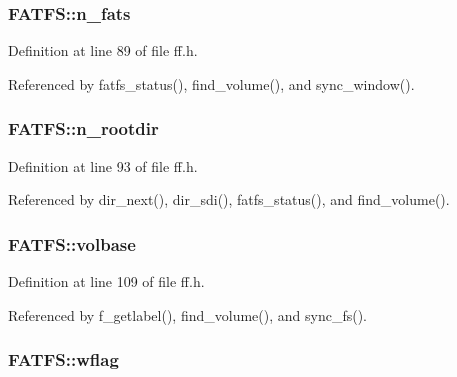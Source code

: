\subsubsection[{\texorpdfstring{n\+\_\+fats}{n_fats}}]{ F\+A\+T\+F\+S\+::n\+\_\+fats}\hypertarget{structFATFS_a56716c7e7ac10cf46e73ffb2a2e9b545}{}\label{structFATFS_a56716c7e7ac10cf46e73ffb2a2e9b545}


Definition at line 89 of file ff.\+h.



Referenced by fatfs\+\_\+status(), find\+\_\+volume(), and sync\+\_\+window().

\subsubsection[{\texorpdfstring{n\+\_\+rootdir}{n_rootdir}}]{ F\+A\+T\+F\+S\+::n\+\_\+rootdir}\hypertarget{structFATFS_a189a00aa038044ffad0fc7f7dcf2aae1}{}\label{structFATFS_a189a00aa038044ffad0fc7f7dcf2aae1}


Definition at line 93 of file ff.\+h.



Referenced by dir\+\_\+next(), dir\+\_\+sdi(), fatfs\+\_\+status(), and find\+\_\+volume().

\subsubsection[{\texorpdfstring{volbase}{volbase}}]{ F\+A\+T\+F\+S\+::volbase}\hypertarget{structFATFS_a8f0ca578755749d204f59dc83f1a7649}{}\label{structFATFS_a8f0ca578755749d204f59dc83f1a7649}


Definition at line 109 of file ff.\+h.



Referenced by f\+\_\+getlabel(), find\+\_\+volume(), and sync\+\_\+fs().

\subsubsection[{\texorpdfstring{wflag}{wflag}}]{ F\+A\+T\+F\+S\+::wflag}\hypertarget{structFATFS_a647e43c9ccae94b7274793d1909897de}{}\label{structFATFS_a647e43c9ccae94b7274793d1909897de}


